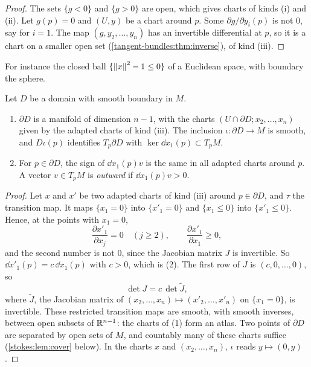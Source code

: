 \begin{notechapter}
\begin{proof}
The sets $\{g < 0\}$ and $\{g > 0\}$ are open, which gives charts of
kinds (i) and (ii). Let $g(p) = 0$ and $(U, y)$ be a chart around $p$.
Some $\partial g/\partial y_i(p)$ is not $0$, say for $i = 1$. The map
$(g, y_2,\dots,y_n)$ has an invertible differential at $p$, so it is a
chart on a smaller open set
(\cref{tangent-bundles:thm:inverse}), of kind (iii).
\end{proof}

For instance the closed ball $\{\left\|x\right\|^2 - 1\leq0\}$ of a Euclidean
space, with boundary the sphere.

\begin{proposition}\label{stokes:prop:boundary}
Let $D$ be a domain with smooth boundary in $M$.
\begin{enumerate}[nosep]
  \item $\partial D$ is a manifold of dimension $n - 1$, with the
        charts $(U\cap\partial D; x_2,\dots,x_n)$ given by the adapted
        charts of kind \textup{(iii)}. The inclusion
        $\iota:\partial D\to M$ is smooth, and $D\iota(p)$ identifies
        $T_p\partial D$ with $\ker\dd x_1(p)\subset T_pM$.
  \item For $p\in\partial D$, the sign of $\dd x_1(p)v$ is the same in
        all adapted charts around $p$. A vector $v\in T_pM$ is
        \emph{outward} if $\dd x_1(p)v > 0$.
\end{enumerate}
\end{proposition}

\begin{proof}
Let $x$ and $x'$ be two adapted charts of kind (iii) around
$p\in\partial D$, and $\tau$ the transition map. It maps $\{x_1 = 0\}$
into $\{x'_1 = 0\}$ and $\{x_1\leq0\}$ into $\{x'_1\leq0\}$. Hence, at
the points with $x_1 = 0$,
\[
  \frac{\partial x'_1}{\partial x_j} = 0\quad(j\geq2) ,
  \qquad
  \frac{\partial x'_1}{\partial x_1}\geq0 ,
\]
and the second number is not $0$, since the Jacobian matrix $J$ is
invertible. So $\dd x'_1(p) = c\,\dd x_1(p)$ with $c > 0$, which is (2).
The first row of $J$ is $(c, 0,\dots,0)$, so
\begin{equation}\label{stokes:eq:block}
  \det J = c\,\det\tilde J ,
\end{equation}
where $\tilde J$, the Jacobian matrix of
$(x_2,\dots,x_n)\mapsto(x'_2,\dots,x'_n)$ on $\{x_1 = 0\}$, is
invertible. These restricted transition maps are smooth, with smooth
inverses, between open subsets of $\mathbb{R}^{n-1}$: the charts of (1) form an
atlas. Two points of $\partial D$ are separated by open sets of $M$,
and countably many of these charts suffice
(\cref{stokes:lem:cover} below). In the charts $x$ and
$(x_2,\dots,x_n)$, $\iota$ reads $y\mapsto(0, y)$.
\end{proof}


\end{notechapter}
